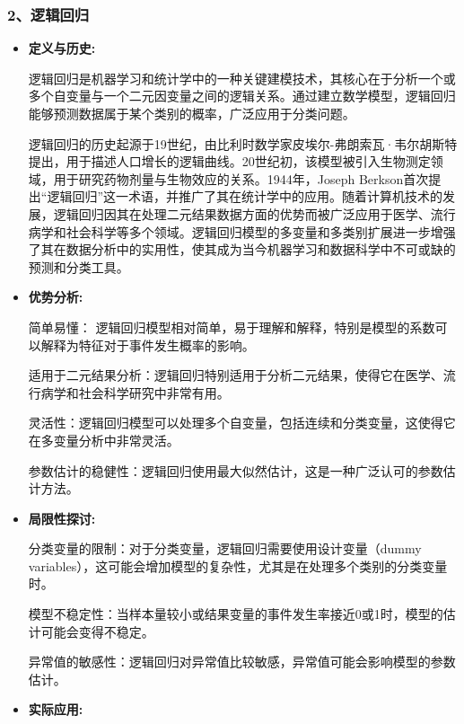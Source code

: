 \subsubsection{2、逻辑回归}
\begin{itemize}

    \item \textbf{定义与历史:} 
           \setlength{\parindent}{2em}

逻辑回归是机器学习和统计学中的一种关键建模技术，其核心在于分析一个或多个自变量与一个二元因变量之间的逻辑关系。通过建立数学模型，逻辑回归能够预测数据属于某个类别的概率，广泛应用于分类问题。
          
逻辑回归的历史起源于19世纪，由比利时数学家皮埃尔-弗朗索瓦·韦尔胡斯特提出，用于描述人口增长的逻辑曲线。20世纪初，该模型被引入生物测定领域，用于研究药物剂量与生物效应的关系。1944年，Joseph Berkson首次提出“逻辑回归”这一术语，并推广了其在统计学中的应用。随着计算机技术的发展，逻辑回归因其在处理二元结果数据方面的优势而被广泛应用于医学、流行病学和社会科学等多个领域。逻辑回归模型的多变量和多类别扩展进一步增强了其在数据分析中的实用性，使其成为当今机器学习和数据科学中不可或缺的预测和分类工具。

        
    \item \textbf{优势分析:} 
           \setlength{\parindent}{2em}

简单易懂： 逻辑回归模型相对简单，易于理解和解释，特别是模型的系数可以解释为特征对于事件发生概率的影响。
            
适用于二元结果分析：逻辑回归特别适用于分析二元结果，使得它在医学、流行病学和社会科学研究中非常有用。

灵活性：逻辑回归模型可以处理多个自变量，包括连续和分类变量，这使得它在多变量分析中非常灵活。

参数估计的稳健性：逻辑回归使用最大似然估计，这是一种广泛认可的参数估计方法。
           
\item \textbf{局限性探讨:} 
    
           \setlength{\parindent}{2em}
分类变量的限制：对于分类变量，逻辑回归需要使用设计变量（dummy variables），这可能会增加模型的复杂性，尤其是在处理多个类别的分类变量时。
        
模型不稳定性：当样本量较小或结果变量的事件发生率接近0或1时，模型的估计可能会变得不稳定。
        
异常值的敏感性：逻辑回归对异常值比较敏感，异常值可能会影响模型的参数估计。

    \item \textbf{实际应用:} 
           \setlength{\parindent}{2em}
           

\end{itemize}
